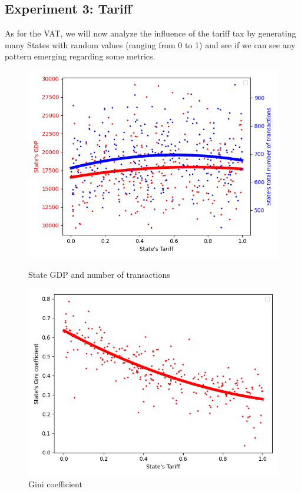 {{    \subsection{Experiment 3: Tariff}
    As for the VAT, we will now analyze the influence of the tariff tax by generating many States with random values (ranging from 0 to 1) and see if we can see any pattern emerging regarding some metrics. 

        \begin{figure}[H]
                \includegraphics[width=\linewidth]{img/exp/3_1.png}
                \caption{State GDP and number of transactions}
            \endminipage\hfill
                \includegraphics[width=\linewidth]{img/exp/3_3.png}
                \caption{Gini coefficient}
            \endminipage\hfill
        \end{figure}

}}
